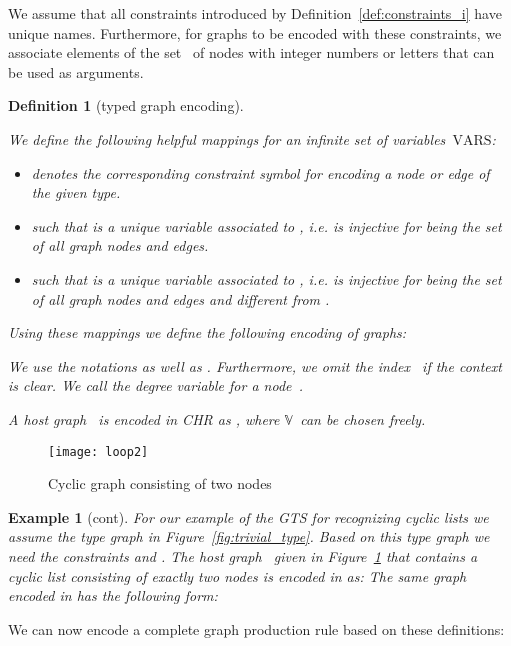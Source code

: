 \documentclass{tlp}
\newtheorem{example}{Example}[section]
\newtheorem{definition}{Definition}[section]
\newcommand{\bbV}{\ensuremath{\mathbb{V}}}
\newcommand{\VARS}{\ensuremath{\mbox{VARS}}}
\begin{document}
We assume that all constraints introduced by Definition~\ref{def:constraints_i}
have unique names. Furthermore, for graphs to be encoded with these constraints,
we associate elements of the set~ of nodes with integer numbers or letters
that can be used as arguments.

\begin{definition}[typed graph encoding]\label{def:encoding}
 
We define the following helpful mappings for an infinite set
of variables~\VARS:

\begin{itemize}
  \item  denotes the corresponding constraint symbol for encoding a
  node or edge of the given type.

  \item  such that  is a unique
  variable associated to , i.e.  is injective for  being the set of
  all graph nodes and edges.
  
  \item  such that  is a unique
  variable associated to , i.e.  is injective for  being the set of
  all graph nodes and edges and different from .
\end{itemize}

Using these mappings we define the following encoding of graphs:


We use the notations  as
well as . Furthermore, we omit the
index~ if the context is clear. We call  the \emph{degree variable}
for a node~.

A host graph~ is encoded in CHR as , where
\bbV\ can be chosen freely.
\end{definition}

\begin{figure}
\texttt{[image: loop2]}
\caption{Cyclic graph consisting of two nodes} 
\label{fig:loop2}
\end{figure}

\begin{example}[cont] For our example of the GTS for recognizing cyclic lists we
assume the type graph in Figure~\ref{fig:trivial_type}. Based on this type graph
we need the constraints  and . The host graph~ given in
Figure~\ref{fig:loop2} that contains a cyclic list consisting of exactly two
nodes is encoded in  as:  The same
graph~ encoded in  has the following form: 
\end{example}

We can now encode a complete graph production rule based on these definitions:
\end{document}

